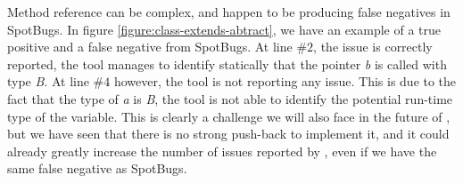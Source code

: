 Method reference can be complex, and happen to be producing false negatives in SpotBugs. 
In figure \ref{figure:class-extends-abtract}, we have an example of a true positive and a false negative from SpotBugs. 
At line $\#2$, the issue is correctly reported, the tool manages to identify statically that the pointer \emph{b} is called with type \emph{B}. 
At line $\#4$ however, the tool is not reporting any issue. 
This is due to the fact that the type of \emph{a} is \emph{B}, the tool is not able to identify the potential run-time type of the variable. \newline
This is clearly a challenge we will also face in the future of \slang{}, but we have seen that there is no strong push-back to implement it, and it could already greatly increase the number of issues reported by \slang{}, even if we have the same false negative as SpotBugs.
